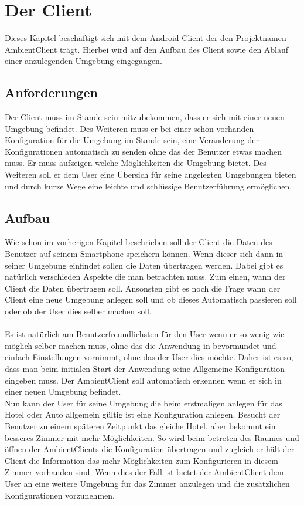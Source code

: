 \chapter{Der Client}

Dieses Kapitel beschäftigt sich mit dem Android Client der den Projektnamen AmbientClient trägt. Hierbei wird auf den Aufbau des Client sowie 
den Ablauf einer anzulegenden Umgebung eingegangen.

\section{Anforderungen}
Der Client muss im Stande sein mitzubekommen, dass er sich mit einer neuen Umgebung befindet. Des Weiteren muss er bei einer schon vorhanden Konfiguration 
für die Umgebung im Stande sein, eine Veränderung der Konfigurationen automatisch zu senden ohne das der Benutzer etwas machen muss.
Er muss aufzeigen welche Möglichkeiten die Umgebung bietet. Des Weiteren soll er dem User eine Übersich für seine angelegten Umgebungen bieten und durch kurze Wege 
eine leichte und schlüssige Benutzerführung ermöglichen.   

\section{Aufbau} 
Wie schon im vorherigen Kapitel beschrieben soll der Client die Daten des Benutzer auf seinem Smartphone speichern können. 
Wenn dieser sich dann in seiner Umgebung einfindet sollen die Daten übertragen werden. 
Dabei gibt es natürlich verschieden Aspekte die man betrachten muss. Zum einen, wann der Client die Daten übertragen soll. 
Ansonsten gibt es noch die Frage wann der Client eine neue Umgebung anlegen soll und ob dieses Automatisch passieren soll oder ob der User dies selber machen soll.
\\\\
Es ist natürlich am Benutzerfreundlichsten für den User wenn er so wenig wie möglich selber machen muss, 
ohne das die Anwendung in bevormundet und einfach Einstellungen vornimmt, ohne das der User dies möchte. 
Daher ist es so, dass man beim initialen Start der Anwendung seine Allgemeine Konfiguration eingeben muss. 
Der AmbientClient soll automatisch erkennen wenn er sich in einer neuen Umgebung befindet. 
\\
Nun kann der User für seine Umgebung die beim erstmaligen anlegen für das Hotel oder Auto allgemein gültig ist eine Konfiguration anlegen. 
Besucht der Benutzer zu einem späteren Zeitpunkt das gleiche Hotel, aber bekommt ein besseres Zimmer mit mehr Möglichkeiten. 
So wird beim betreten des Raumes und öffnen der AmbientClients
die Konfiguration übertragen und zugleich er hält der Client die Information das mehr Möglichkeiten zum Konfigurieren in diesem Zimmer vorhanden sind. 
Wenn dies der Fall ist bietet der AmbientClient dem User an eine weitere Umgebung für das Zimmer anzulegen und die zusätzlichen Konfigurationen vorzunehmen.



